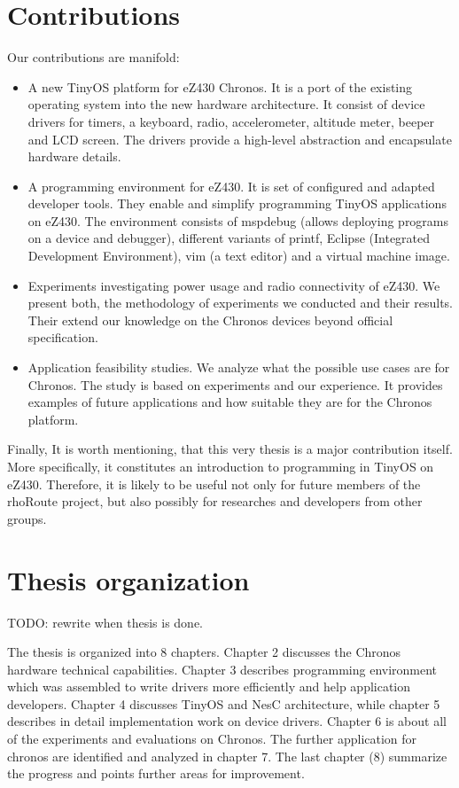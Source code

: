 \section{Contributions}
Our contributions are manifold:
\begin{itemize}
  \item A new TinyOS platform for eZ430 Chronos.
It is a port of the existing operating system into the new hardware architecture.
It consist of device drivers for timers, a keyboard, radio, accelerometer, altitude meter, beeper and LCD screen.
The drivers provide a high-level abstraction and encapsulate hardware details.
  \item A programming environment for eZ430. It is set of configured and adapted developer tools. They enable and simplify programming TinyOS applications on eZ430.
The environment consists of mspdebug (allows deploying programs on a device and debugger), different variants of printf, Eclipse (Integrated Development Environment), vim (a text editor) and a virtual machine image.
  \item Experiments investigating power usage and radio connectivity of eZ430.
We present both, the methodology of experiments we conducted and their results.
Their extend our knowledge on the Chronos devices beyond official specification.
  \item Application feasibility studies.
We analyze what the possible use cases are for Chronos.
The study is based on experiments and our experience.
It provides examples of future applications and how suitable they are for the Chronos platform.
\end{itemize}

Finally, It is worth mentioning, that this very thesis is a major contribution itself. More specifically, it constitutes an introduction to programming in TinyOS on eZ430. Therefore, it is likely to be useful not only for future members of the rhoRoute project, but also possibly for researches and developers from other groups.

\section{Thesis organization}
TODO: rewrite when thesis is done.

The thesis is organized into 8 chapters. Chapter 2 discusses the Chronos hardware technical capabilities. Chapter 3 describes programming environment which was assembled to write drivers more efficiently and help application developers. Chapter 4 discusses TinyOS and NesC architecture, while chapter 5 describes in detail implementation work on device drivers. Chapter 6 is about all of the experiments and evaluations on Chronos. The further application for chronos are identified and analyzed in chapter 7. The last chapter (8) summarize the progress and points further areas for improvement.
